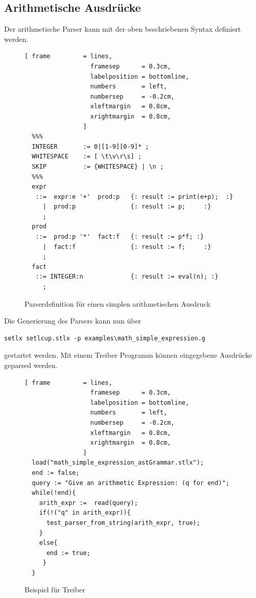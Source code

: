 \subsection{Arithmetische Ausdrücke}
Der arithmetische Parser  kann mit der oben beschriebenen Syntax definiert werden.
\begin{figure}[!ht]
\begin{Verbatim}[ frame         = lines, 
                  framesep      = 0.3cm, 
                  labelposition = bottomline,
                  numbers       = left,
                  numbersep     = -0.2cm,
                  xleftmargin   = 0.8cm,
                  xrightmargin  = 0.8cm,
                ]
  %%%
  INTEGER       := 0|[1-9][0-9]* ;
  WHITESPACE    := [ \t\v\r\s] ;
  SKIP          := {WHITESPACE} | \n ;
  %%%
  expr 
   ::=  expr:e '+'  prod:p   {: result := print(e+p);  :} 
     |  prod:p               {: result := p;     :}
     ;
  prod 
   ::=  prod:p '*'  fact:f   {: result := p*f; :}
     |  fact:f               {: result := f;     :}
     ;
  fact 
   ::= INTEGER:n             {: result := eval(n); :} 
     ;
\end{Verbatim}
\caption{Parserdefinition für einen simplen arithmetischen Ausdruck}
\label{fig:example_arithmetic_grammer}
\end{figure}
%
Die Generierung des Parsers kann nun über
\begin{Verbatim}
setlx setlcup.stlx -p examples\math_simple_expression.g
\end{Verbatim}
gestartet werden.
Mit einem Treiber Programm können eingegebene Ausdrücke geparsed werden.
\begin{figure}[!htb]
\begin{Verbatim}[ frame         = lines, 
                  framesep      = 0.3cm, 
                  labelposition = bottomline,
                  numbers       = left,
                  numbersep     = -0.2cm,
                  xleftmargin   = 0.8cm,
                  xrightmargin  = 0.8cm,
                ]
  load("math_simple_expression_astGrammar.stlx");
  end := false;
  query := "Give an arithmetic Expression: (q for end)";
  while(!end){
    arith_expr :=  read(query);
    if(!("q" in arith_expr)){
      test_parser_from_string(arith_expr, true);
    }
    else{
      end := true;
     }
  }
\end{Verbatim}
\caption{Beispiel für Treiber}
\label{fig:simple_arith_driver}
\end{figure}
